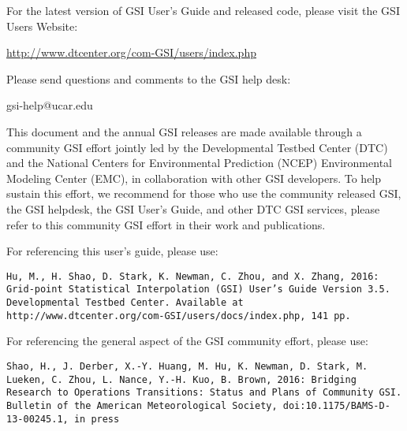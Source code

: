 \begin{titlepage}
\begin{flushleft}

For the latest version of GSI User's Guide and released code, please visit the GSI User\textquotesingle s Website:
\begin{center}
\url{http://www.dtcenter.org/com-GSI/users/index.php}
\end{center}

Please send questions and comments to the GSI help desk:
\begin{center}
gsi-help@ucar.edu
\end{center}

This document and the annual GSI releases are made available through a community GSI effort jointly led by the Developmental Testbed Center (DTC) and the National Centers for Environmental Prediction (NCEP) Environmental Modeling Center (EMC), in collaboration with other GSI developers. To help sustain this effort, we recommend for those who use the community released GSI, the GSI helpdesk, the GSI User's Guide, and other DTC GSI services, please refer to this community GSI effort in their work and publications. 

For referencing this user's guide, please use:

\texttt{Hu, M., H. Shao, D. Stark, K. Newman, C. Zhou, and X. Zhang, 2016: Grid-point Statistical
Interpolation (GSI) User's Guide Version 3.5. Developmental Testbed Center. Available at
http://www.dtcenter.org/com-GSI/users/docs/index.php, 141 pp.}

For referencing the general aspect of the GSI community effort, please use:

\texttt{Shao, H., J. Derber, X.-Y. Huang, M. Hu, K. Newman, D. Stark, M. Lueken, C. Zhou, L. Nance, Y.-H. Kuo, B. Brown, 2016: Bridging Research to Operations Transitions: Status and Plans of Community GSI. Bulletin of the American Meteorological Society, doi:10.1175/BAMS-D-13-00245.1, in press}


\end{flushleft}
\end{titlepage}
\pagebreak{}




